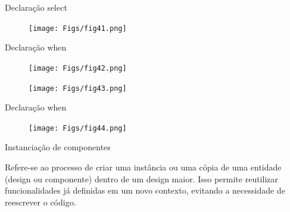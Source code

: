 \documentclass[aspectratio=169]{beamer}
\begin{document}
\begin{frame}{Declaração select}
	\justifying
	
	
	\begin{figure}[h]
		\centering
		\texttt{[image: Figs/fig41.png]}
	\end{figure}
	
	
\end{frame}
\begin{frame}{Declaração when}
	\justifying
	
	
	\begin{figure}[h]
		\centering
		\texttt{[image: Figs/fig42.png]}
	\end{figure}
	
	\begin{figure}[h]
	\centering
	\texttt{[image: Figs/fig43.png]}
	\end{figure}
	
\end{frame}
\begin{frame}{Declaração when}
	\justifying
	
	
	\begin{figure}[h]
	\centering
	\texttt{[image: Figs/fig44.png]}
	\end{figure}
	
	
\end{frame}
\begin{frame}{Instanciação de componentes}
	\justifying
	
	\begin{block}{}
	Refere-se ao processo de criar uma instância ou uma cópia de uma entidade (design ou componente) dentro de um design maior. Isso permite reutilizar funcionalidades já definidas em um novo contexto, evitando a necessidade de reescrever o código.
	
	\end{block}
	
%	
	
\end{frame}
\end{document}
